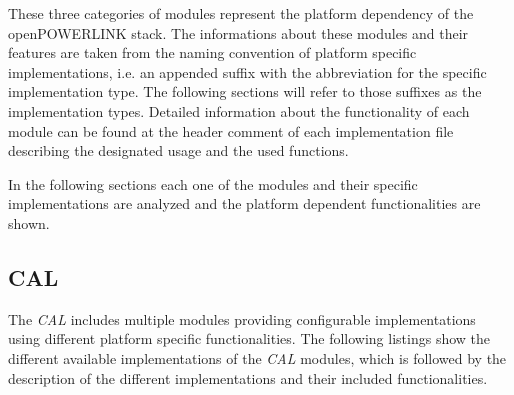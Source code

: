 These three categories of modules represent the platform dependency of the openPOWERLINK stack.
The informations about these modules and their features are taken from the naming convention of platform specific implementations, i.e. an appended suffix with the abbreviation for the specific implementation type.
The following sections will refer to those suffixes as the implementation types.
Detailed information about the functionality of each module can be found at the header comment of each implementation file describing the designated usage and the used functions.

In the following sections each one of the modules and their specific implementations are analyzed and the platform dependent functionalities are shown.

\subsection{CAL}
\label{sec:oplk_platform_cal}

The \emph{CAL} includes multiple modules providing configurable implementations using different platform specific functionalities.
The following listings show the different available implementations of the \emph{CAL} modules, which is followed by the description of the different implementations and their included functionalities.
\\
    
